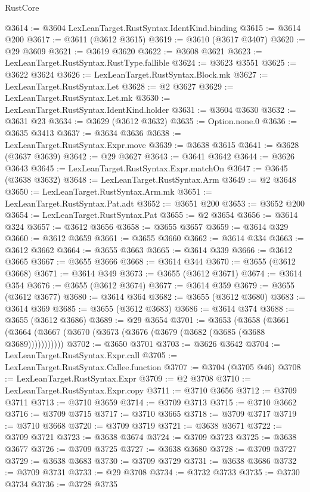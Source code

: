 \begin{lexlean}{RustCore}
\begin{coremodule}
@3614 := @3604 LexLeanTarget.RustSyntax.IdentKind.binding
@3615 := @3614 @200
@3617 := @3611 (@3612 @3615)
@3619 := @3610 (@3617 @3407)
@3620 := @29 @3609
@3621 := @3619 @3620
@3622 := @3608 @3621
@3623 := LexLeanTarget.RustSyntax.RustType.fallible
@3624 := @3623 @3551
@3625 := @3622 @3624
@3626 := LexLeanTarget.RustSyntax.Block.mk
@3627 := LexLeanTarget.RustSyntax.Let
@3628 := @2 @3627
@3629 := LexLeanTarget.RustSyntax.Let.mk
@3630 := LexLeanTarget.RustSyntax.IdentKind.holder
@3631 := @3604 @3630
@3632 := @3631 @23
@3634 := @3629 (@3612 @3632)
@3635 := Option.none.{0}
@3636 := @3635 @3413
@3637 := @3634 @3636
@3638 := LexLeanTarget.RustSyntax.Expr.move
@3639 := @3638 @3615
@3641 := @3628 (@3637 @3639)
@3642 := @29 @3627
@3643 := @3641 @3642
@3644 := @3626 @3643
@3645 := LexLeanTarget.RustSyntax.Expr.matchOn
@3647 := @3645 (@3638 @3632)
@3648 := LexLeanTarget.RustSyntax.Arm
@3649 := @2 @3648
@3650 := LexLeanTarget.RustSyntax.Arm.mk
@3651 := LexLeanTarget.RustSyntax.Pat.adt
@3652 := @3651 @200
@3653 := @3652 @200
@3654 := LexLeanTarget.RustSyntax.Pat
@3655 := @2 @3654
@3656 := @3614 @324
@3657 := @3612 @3656
@3658 := @3655 @3657
@3659 := @3614 @329
@3660 := @3612 @3659
@3661 := @3655 @3660
@3662 := @3614 @334
@3663 := @3612 @3662
@3664 := @3655 @3663
@3665 := @3614 @339
@3666 := @3612 @3665
@3667 := @3655 @3666
@3668 := @3614 @344
@3670 := @3655 (@3612 @3668)
@3671 := @3614 @349
@3673 := @3655 (@3612 @3671)
@3674 := @3614 @354
@3676 := @3655 (@3612 @3674)
@3677 := @3614 @359
@3679 := @3655 (@3612 @3677)
@3680 := @3614 @364
@3682 := @3655 (@3612 @3680)
@3683 := @3614 @369
@3685 := @3655 (@3612 @3683)
@3686 := @3614 @374
@3688 := @3655 (@3612 @3686)
@3689 := @29 @3654
@3701 := @3653
    (@3658 (@3661 (@3664 (@3667 (@3670 (@3673 (@3676 (@3679 (@3682 (@3685 (@3688 @3689)))))))))))
@3702 := @3650 @3701
@3703 := @3626 @3642
@3704 := LexLeanTarget.RustSyntax.Expr.call
@3705 := LexLeanTarget.RustSyntax.Callee.function
@3707 := @3704 (@3705 @46)
@3708 := LexLeanTarget.RustSyntax.Expr
@3709 := @2 @3708
@3710 := LexLeanTarget.RustSyntax.Expr.copy
@3711 := @3710 @3656
@3712 := @3709 @3711
@3713 := @3710 @3659
@3714 := @3709 @3713
@3715 := @3710 @3662
@3716 := @3709 @3715
@3717 := @3710 @3665
@3718 := @3709 @3717
@3719 := @3710 @3668
@3720 := @3709 @3719
@3721 := @3638 @3671
@3722 := @3709 @3721
@3723 := @3638 @3674
@3724 := @3709 @3723
@3725 := @3638 @3677
@3726 := @3709 @3725
@3727 := @3638 @3680
@3728 := @3709 @3727
@3729 := @3638 @3683
@3730 := @3709 @3729
@3731 := @3638 @3686
@3732 := @3709 @3731
@3733 := @29 @3708
@3734 := @3732 @3733
@3735 := @3730 @3734
@3736 := @3728 @3735

\end{coremodule}
\end{lexlean}

